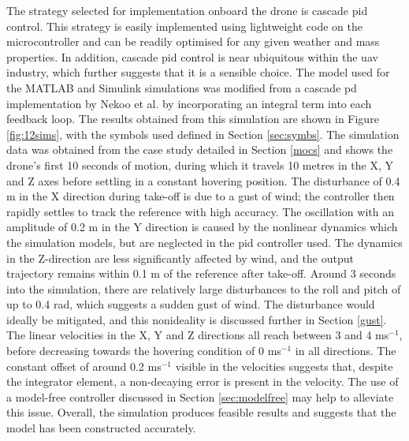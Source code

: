 The strategy selected for implementation onboard the drone is cascade \gls{pid} control. This strategy is easily implemented using lightweight code on the microcontroller and can be readily optimised for any given weather and mass properties. In addition, cascade \gls{pid} control is near ubiquitous within the \gls{uav} industry, which further suggests that it is a sensible choice. The model used for the MATLAB and Simulink simulations was modified from a cascade \gls{pd} implementation by Nekoo et al. \cite{nekoo} by incorporating an integral term into each feedback loop. The results obtained from this simulation are shown in Figure \ref{fig:12sims}, with the symbols used defined in Section \ref{sec:symbs}. The simulation data was obtained from the case study detailed in Section \ref{mocs} and shows the drone's first 10 seconds of motion, during which it travels 10 metres in the X, Y and Z axes before settling in a constant hovering position. The disturbance of 0.4 m in the X direction during take-off is due to a gust of wind; the controller then rapidly settles to track the reference with high accuracy. The oscillation with an amplitude of 0.2 m in the Y direction is caused by the nonlinear dynamics which the simulation models, but are neglected in the \gls{pid} controller used. The dynamics in the Z-direction are less significantly affected by wind, and the output trajectory remains within 0.1 m of the reference after take-off. Around 3 seconds into the simulation, there are relatively large disturbances to the roll and pitch of up to 0.4 rad, which suggests a sudden gust of wind. The disturbance would ideally be mitigated, and this nonideality is discussed further in Section \ref{gust}. The linear velocities in the X, Y and Z directions all reach between 3 and 4 ms${^{-1}}$, before decreasing towards the hovering condition of 0 ms${^{-1}}$ in all directions. The constant offset of around 0.2 ms${^{-1}}$ visible in the velocities suggests that, despite the integrator element, a non-decaying error is present in the velocity. The use of a model-free controller discussed in Section \ref{sec:modelfree} may help to alleviate this issue. Overall, the simulation produces feasible results and suggests that the model has been constructed accurately.



